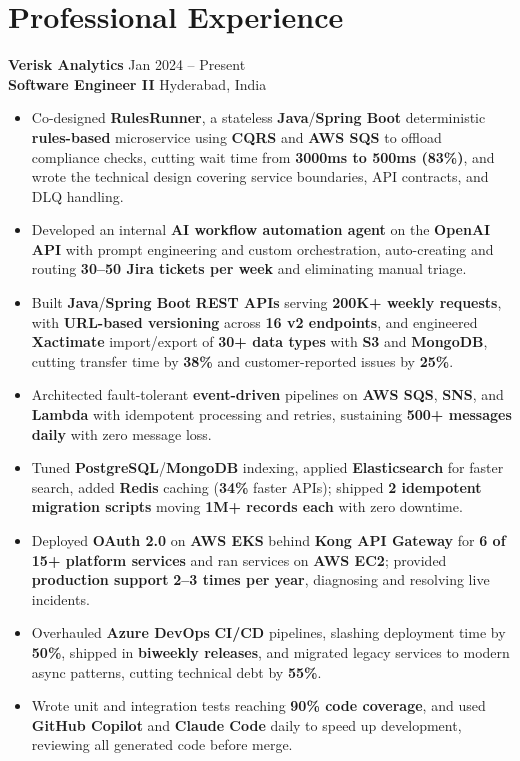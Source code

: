 \documentclass[a4paper,10pt]{article}
\begin{document}
\section*{Professional Experience}

\textbf{Verisk Analytics} \hfill Jan 2024 -- Present \\
\textbf{Software Engineer II} \hfill Hyderabad, India

\begin{itemize}[leftmargin=*]
    \item Co-designed \textbf{RulesRunner}, a stateless \textbf{Java}/\textbf{Spring Boot} deterministic \textbf{rules-based} microservice using \textbf{CQRS} and \textbf{AWS SQS} to offload compliance checks, cutting wait time from \textbf{3000ms to 500ms (83\%)}, and wrote the technical design covering service boundaries, API contracts, and DLQ handling.
    \item Developed an internal \textbf{AI workflow automation agent} on the \textbf{OpenAI API} with prompt engineering and custom orchestration, auto-creating and routing \textbf{30--50 Jira tickets per week} and eliminating manual triage.
    \item Built \textbf{Java}/\textbf{Spring Boot} \textbf{REST APIs} serving \textbf{200K+ weekly requests}, with \textbf{URL-based versioning} across \textbf{16 v2 endpoints}, and engineered \textbf{Xactimate} import/export of \textbf{30+ data types} with \textbf{S3} and \textbf{MongoDB}, cutting transfer time by \textbf{38\%} and customer-reported issues by \textbf{25\%}.
    \item Architected fault-tolerant \textbf{event-driven} pipelines on \textbf{AWS SQS}, \textbf{SNS}, and \textbf{Lambda} with idempotent processing and retries, sustaining \textbf{500+ messages daily} with zero message loss.
    \item Tuned \textbf{PostgreSQL}/\textbf{MongoDB} indexing, applied \textbf{Elasticsearch} for faster search, added \textbf{Redis} caching (\textbf{34\%} faster APIs); shipped \textbf{2 idempotent migration scripts} moving \textbf{1M+ records each} with zero downtime.
    \item Deployed \textbf{OAuth 2.0} on \textbf{AWS EKS} behind \textbf{Kong API Gateway} for \textbf{6 of 15+ platform services} and ran services on \textbf{AWS EC2}; provided \textbf{production support} \textbf{2--3 times per year}, diagnosing and resolving live incidents.
    \item Overhauled \textbf{Azure DevOps} \textbf{CI/CD} pipelines, slashing deployment time by \textbf{50\%}, shipped in \textbf{biweekly releases}, and migrated legacy services to modern async patterns, cutting technical debt by \textbf{55\%}.
    \item Wrote unit and integration tests reaching \textbf{90\% code coverage}, and used \textbf{GitHub Copilot} and \textbf{Claude Code} daily to speed up development, reviewing all generated code before merge.
\end{itemize}
\end{document}
